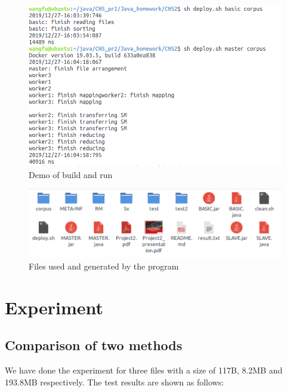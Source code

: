 \documentclass[a4paper,14pt,UTF8]{article}
\begin{document}
	\begin{figure}[h]
		\setlength{\abovecaptionskip}{-0.cm}
		
		\begin{center}
			\includegraphics[width=12cm]{run}
		\end{center}
		\caption{Demo of build and run}
	\end{figure}

	\begin{figure}[h]
		\setlength{\abovecaptionskip}{-0.cm}
		
		\begin{center}
			\includegraphics[width=12cm]{files}
		\end{center}
		\caption{Files used and generated by the program}
	\end{figure}

	\section{Experiment}
		\subsection{Comparison of two methods}
		\quad We have done the experiment for three files with a size of 117B, 8.2MB and 193.8MB respectively. The test results are shown as follows: 
		
\end{document}
